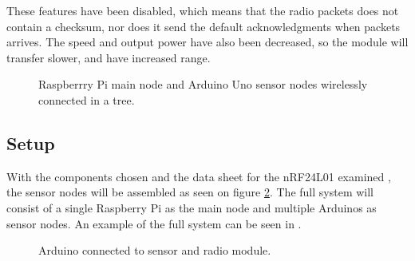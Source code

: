 These features have been disabled, which means that the radio packets does not contain a checksum, nor does it send the default acknowledgments when packets arrives. The speed and output power have also been decreased, so the module will transfer slower, and have increased range.

\begin{figure}[!h]
	\centering
	\caption{Raspberrry Pi main node and Arduino Uno sensor nodes wirelessly connected in a tree.}
	\label{fig:raspbuinoTree}
\end{figure}

\subsection*{Setup}
With the components chosen and the data sheet for the nRF24L01 examined \cite{nf24datasheet}, the sensor nodes will be assembled as seen on figure \ref{fig:compsketch}. The full system will consist of a single Raspberry Pi as the main node and multiple Arduinos as sensor nodes. An example of the full system can be seen in .

\begin{figure}[!h]
	\centering
	\caption{Arduino connected to sensor and radio module.}
	\label{fig:compsketch}
\end{figure}

